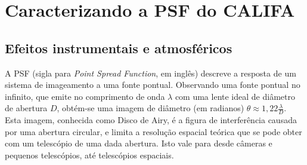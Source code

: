 


\chapter{Caracterizando a PSF do CALIFA}
\label{sec:psf}

\section{Efeitos instrumentais e atmosféricos}
\label{sec:psf:teoria}

A PSF (sigla para {\em Point Spread Function}, em inglês) descreve a resposta de
um sistema de imageamento a uma fonte pontual. Observando uma fonte pontual no
infinito, que emite no comprimento de onda $\lambda$ com uma lente ideal de
diâmetro de abertura $D$, obtém-se uma imagem de diâmetro (em radianos) $\theta
\approx 1,22\frac{\lambda}{D}$. Esta imagem, conhecida como Disco de Airy, é a
figura de interferência causada por uma abertura circular, e limita a resolução
espacial teórica que se pode obter com um telescópio de uma dada abertura. Isto
vale para desde câmeras e pequenos telescópios, até telescópios espaciais.

